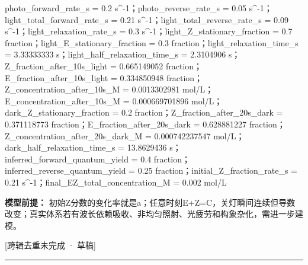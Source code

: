 \documentclass[UTF8,11pt,a4paper]{ctexart}
\begin{document}
photo\_forward\_rate\_s = 0.2 s\textasciicircum{}-1；photo\_reverse\_rate\_s = 0.05 s\textasciicircum{}-1；light\_total\_forward\_rate\_s = 0.21 s\textasciicircum{}-1；light\_total\_reverse\_rate\_s = 0.09 s\textasciicircum{}-1；light\_relaxation\_rate\_s = 0.3 s\textasciicircum{}-1；light\_Z\_stationary\_fraction = 0.7 fraction；light\_E\_stationary\_fraction = 0.3 fraction；light\_relaxation\_time\_s = 3.33333333 s；light\_half\_relaxation\_time\_s = 2.3104906 s；Z\_fraction\_after\_10s\_light = 0.665149052 fraction；E\_fraction\_after\_10s\_light = 0.334850948 fraction；Z\_concentration\_after\_10s\_M = 0.0013302981 mol/L；E\_concentration\_after\_10s\_M = 0.000669701896 mol/L；dark\_Z\_stationary\_fraction = 0.2 fraction；Z\_fraction\_after\_20s\_dark = 0.371118773 fraction；E\_fraction\_after\_20s\_dark = 0.628881227 fraction；Z\_concentration\_after\_20s\_dark\_M = 0.000742237547 mol/L；dark\_half\_relaxation\_time\_s = 13.8629436 s；inferred\_forward\_quantum\_yield = 0.4 fraction；inferred\_reverse\_quantum\_yield = 0.25 fraction；initial\_Z\_fraction\_rate\_s = 0.21 s\textasciicircum{}-1；final\_EZ\_total\_concentration\_M = 0.002 mol/L\par
\noindent\textbf{模型前提：}
初始Z分数的变化率就是a；任意时刻E+Z=C，关灯瞬间连续但导数改变；真实体系若有波长依赖吸收、非均匀照射、光疲劳和构象杂化，需进一步建模。\par
\noindent\textcolor{red!65!black}{[跨辑去重未完成 · 草稿]} \par
\medskip\hrule\medskip
{}
\end{document}
